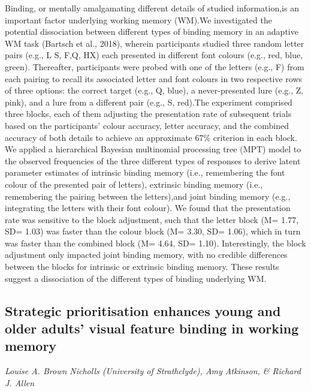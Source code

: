 \documentclass[12pt,]{book}
\begin{document}
Binding, or mentally amalgamating different details of studied information,is an important factor underlying working memory (WM).We investigated the potential dissociation between different types of binding memory in an adaptive WM task (Bartsch et al., 2018), wherein participants studied three random letter pairs (e.g., L S, F‚Q, HX) each presented in different font colours (e.g., red, blue, green). Thereafter, participants were probed with one of the letters (e.g., F) from each pairing to recall its associated letter and font colours in two respective rows of three options: the correct target (e.g., Q, blue), a never-presented lure (e.g., Z, pink), and a lure from a different pair (e.g., S, red).The experiment comprised three blocks, each of them adjusting the presentation rate of subsequent trials based on the participants' colour accuracy, letter accuracy, and the combined accuracy of both details to achieve an approximate 67\% criterion in each block. We applied a hierarchical Bayesian multinomial processing tree (MPT) model to the observed frequencies of the three different types of responses to derive latent parameter estimates of intrinsic binding memory (i.e., remembering the font colour of the presented pair of letters), extrinsic binding memory (i.e., remembering the pairing between the letters),and joint binding memory (e.g., integrating the letters with their font colour). We found that the presentation rate was sensitive to the block adjustment, such that the letter block (M= 1.77, SD= 1.03) was faster than the colour block (M= 3.30, SD= 1.06), which in turn was faster than the combined block (M= 4.64, SD= 1.10). Interestingly, the block adjustment only impacted joint binding memory, with no credible differences between the blocks for intrinsic or extrinsic binding memory. These results suggest a dissociation of the different types of binding underlying WM.

\hypertarget{strategic-prioritisation-enhances-young-and-older-adults-visual-feature-binding-in-working-memory}{%
\subsection{Strategic prioritisation enhances young and older adults' visual feature binding in working memory}\label{strategic-prioritisation-enhances-young-and-older-adults-visual-feature-binding-in-working-memory}}

\emph{Louise A. Brown Nicholls (University of Strathclyde), Amy Atkinson, \& Richard J. Allen}
\end{document}

